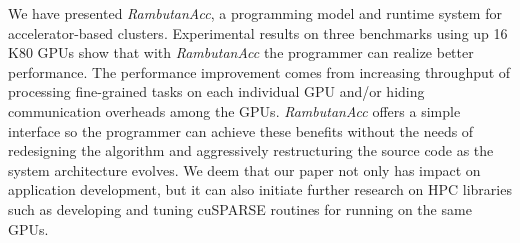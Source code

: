 We have presented {\em RambutanAcc}, a programming model and runtime system for accelerator-based clusters.
Experimental results on three benchmarks using up 16 K80 GPUs show that with {\em RambutanAcc} the programmer can realize better performance.
The performance improvement comes from increasing throughput of processing fine-grained tasks on each individual GPU and/or hiding communication overheads among the GPUs.
{\em RambutanAcc} offers a simple interface so the programmer can achieve these benefits without the needs of redesigning the algorithm and aggressively restructuring the source code as the system architecture evolves.
We deem that our paper not only has impact on application development, but it can also initiate further research on HPC libraries such as developing and tuning cuSPARSE routines for running on the same GPUs. 
